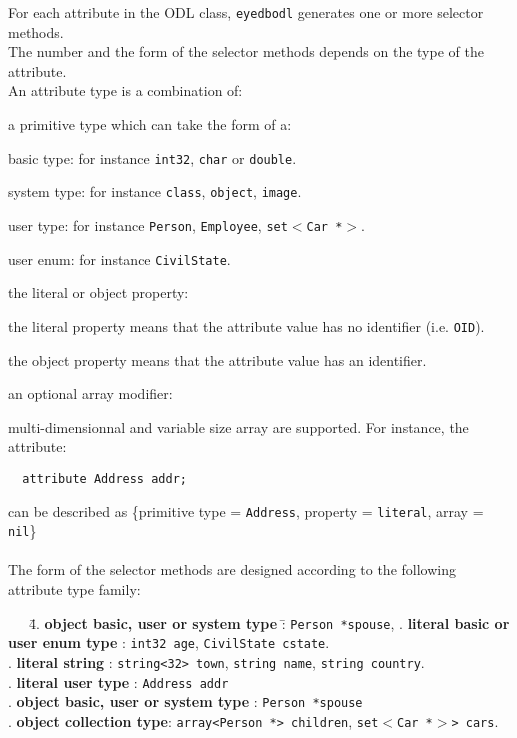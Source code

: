 For each attribute in the ODL class, \texttt{eyedbodl} generates one or more
selector methods.
\\
The number and the form of the selector methods depends on the type
of the attribute.
\\
An attribute type is a combination of:
\be
\item a primitive type which can take the form of a:
\be
\item basic type: for instance \texttt{int32}, \texttt{char} or \texttt{double}.
\item system type: for instance \texttt{class}, \texttt{object}, \texttt{image}.
\item user type: for instance \texttt{Person}, \texttt{Employee},
\texttt{set$<$Car *$>$}.
\item user enum: for instance \texttt{CivilState}.
\ee
\item the literal or object property:
\be
\item the literal property means that the attribute value has no identifier
(i.e. \texttt{OID}).
\item the object property means that the attribute value has an identifier.
\ee
\item an optional array modifier:
\be
\item multi-dimensionnal and variable size array are supported.
\ee
\ee
For instance, the attribute:
\verbsize
\begin{verbatim}
  attribute Address addr;
\end{verbatim}
\normalsize
can be described as
\{primitive type = \texttt{Address}, property = \texttt{literal}, array = \texttt{nil}\}
\\
\\
The form of the selector methods are designed according to the
following attribute type family:
\begin{tabbing}
\mbox{ }\mbox{ }\mbox{ }\=4. {\bf object basic, user or system type} \= : \texttt{Person *spouse},\kill
{}. {\bf literal basic or user enum type} \>: \texttt{int32 age}, \texttt{CivilState cstate}.\\
. {\bf literal string} \>: \texttt{string<32> town}, \texttt{string name},
\texttt{string country}.\\
. {\bf literal user type} \>: \texttt{Address addr}\\
. {\bf object basic, user or system type} \>: \texttt{Person *spouse}\\
. {\bf object collection type}\>: \texttt{array<Person *> children}, \texttt{set$<$Car *$>$> cars}.\\
\end{tabbing}
